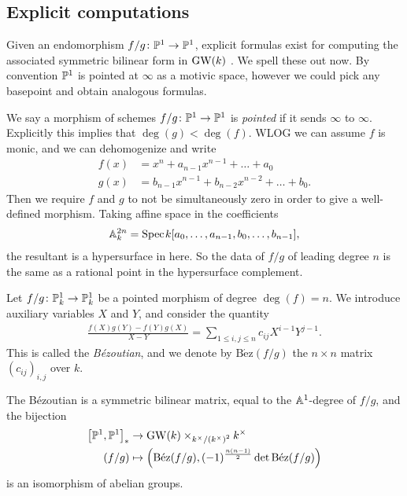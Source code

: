\documentclass[11pt,openany]{book}
\providecommand{\Bez}{\mathrm{B\acute{e}z}}
\begin{document}
\subsection{Explicit computations}
Given an endomorphism $f/g \colon \P^1\to \P^1$, explicit formulas exist for computing the associated symmetric bilinear form in $\GW(k)$ \cite{Cazanave}. We spell these out now. By convention $\P^1$ is pointed at $\infty$ as a motivic space, however we could pick any basepoint and obtain analogous formulas.

\begin{note} We say a morphism of schemes $f/g \colon \P^1 \to \P^1$ is \textit{pointed} if it sends $\infty$ to $\infty$. Explicitly this implies that $\deg(g) < \deg(f)$. WLOG we can assume $f$ is monic, and we can dehomogenize and write
\begin{align*}
    f(x) &= x^n + a_{n-1} x^{n-1} + \ldots + a_0 \\
    g(x) &= b_{n-1}x^{n-1} + b_{n-2}x^{n-2} + \ldots + b_0.
\end{align*}
Then we require $f$ and $g$ to not be simultaneously zero in order to give a well-defined morphism. Taking affine space in the coefficients
\begin{align*}
    \A_k^{2n} = \Spec k[a_0, \ldots, a_{n-1},b_0, \ldots, b_{n-1}],
\end{align*}
the resultant is a hypersurface in here. So the data of $f/g$ of leading degree $n$ is the same as a rational point in the hypersurface complement.
\end{note}


\begin{definition} Let $f/g \colon \P_k^1 \to \P_k^1$ be a pointed morphism of degree $\deg(f) = n$. We introduce auxiliary variables $X$ and $Y$, and consider the quantity
\begin{align*}
    \frac{f(X)g(Y) - f(Y)g(X)}{X-Y} = \sum_{1\le i,j\le n} c_{ij} X^{i-1}Y^{j-1}.
\end{align*}
This is called the \textit{B\'ezoutian}, and we denote by $\Bez(f/g)$ the $n \times n$ matrix $(c_{ij})_{i,j}$ over $k$.
\end{definition}

\begin{theorem} The B\'{e}zoutian is a symmetric bilinear matrix, equal to the $\A^1$-degree of $f/g$, and the bijection
\begin{align*}
    \left[ \P^1,\P^1 \right]_\ast &\to \GW(k) \times_{k^\times / \left( k^\times \right)^2} k^\times \\
    (f/g) &\mapsto \left( \Bez(f/g), (-1)^{\frac{n(n-1)}{2}} \det \Bez(f/g) \right)
\end{align*}
is an isomorphism of abelian groups.
\end{theorem}
\end{document}
